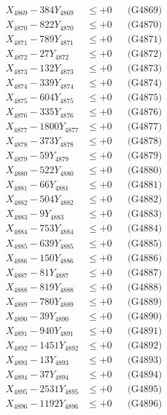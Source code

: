 \documentclass[a4paper,10pt]{article}
\begin{document}
{\begin{align}
X_{4869} - 384Y_{4869} &\leq +0 && \text{(G4869)} \\
X_{4870} - 822Y_{4870} &\leq +0 && \text{(G4870)} \\
\allowbreak
X_{4871} - 789Y_{4871} &\leq +0 && \text{(G4871)} \\
X_{4872} - 27Y_{4872} &\leq +0 && \text{(G4872)} \\
X_{4873} - 132Y_{4873} &\leq +0 && \text{(G4873)} \\
X_{4874} - 339Y_{4874} &\leq +0 && \text{(G4874)} \\
X_{4875} - 604Y_{4875} &\leq +0 && \text{(G4875)} \\
X_{4876} - 335Y_{4876} &\leq +0 && \text{(G4876)} \\
X_{4877} - 1800Y_{4877} &\leq +0 && \text{(G4877)} \\
X_{4878} - 373Y_{4878} &\leq +0 && \text{(G4878)} \\
X_{4879} - 59Y_{4879} &\leq +0 && \text{(G4879)} \\
X_{4880} - 522Y_{4880} &\leq +0 && \text{(G4880)} \\
\allowbreak
X_{4881} - 66Y_{4881} &\leq +0 && \text{(G4881)} \\
X_{4882} - 504Y_{4882} &\leq +0 && \text{(G4882)} \\
X_{4883} - 9Y_{4883} &\leq +0 && \text{(G4883)} \\
X_{4884} - 753Y_{4884} &\leq +0 && \text{(G4884)} \\
X_{4885} - 639Y_{4885} &\leq +0 && \text{(G4885)} \\
X_{4886} - 150Y_{4886} &\leq +0 && \text{(G4886)} \\
X_{4887} - 81Y_{4887} &\leq +0 && \text{(G4887)} \\
X_{4888} - 819Y_{4888} &\leq +0 && \text{(G4888)} \\
X_{4889} - 780Y_{4889} &\leq +0 && \text{(G4889)} \\
X_{4890} - 39Y_{4890} &\leq +0 && \text{(G4890)} \\
\allowbreak
X_{4891} - 940Y_{4891} &\leq +0 && \text{(G4891)} \\
X_{4892} - 1451Y_{4892} &\leq +0 && \text{(G4892)} \\
X_{4893} - 13Y_{4893} &\leq +0 && \text{(G4893)} \\
X_{4894} - 37Y_{4894} &\leq +0 && \text{(G4894)} \\
X_{4895} - 2531Y_{4895} &\leq +0 && \text{(G4895)} \\
X_{4896} - 1192Y_{4896} &\leq +0 && \text{(G4896)} \\

\end{align}}
\end{document}
